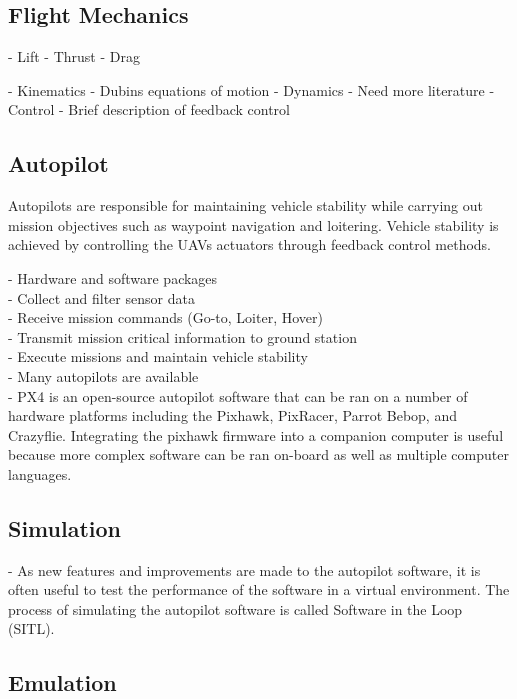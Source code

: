 \documentclass[numbered,pdftex]{ohio-etd}
\begin{document}
\subsection{Flight Mechanics}

- Lift
- Thrust
- Drag

- Kinematics
	- Dubins equations of motion
- Dynamics
	- Need more literature
- Control
	- Brief description of feedback control 
\subsection{Autopilot}

Autopilots are responsible for maintaining vehicle stability while carrying out mission objectives such as waypoint navigation and loitering. Vehicle stability is achieved by controlling the UAVs actuators through feedback control methods. 



- Hardware and software packages \\
- Collect and filter sensor data \\
- Receive mission commands (Go-to, Loiter, Hover) \\
- Transmit mission critical information to ground station \\
- Execute missions and maintain vehicle stability \\

- Many autopilots are available \\
- PX4 is an open-source autopilot software that can be ran on a number of hardware platforms including the Pixhawk, PixRacer, Parrot Bebop, and Crazyflie. Integrating the pixhawk firmware into a companion computer is useful because more complex software can be ran on-board as well as multiple computer languages. \\



\subsection{Simulation}
- As new features and improvements are made to the autopilot software, it is often useful to test the performance of the software in a virtual environment. The process of simulating the autopilot software is called Software in the Loop (SITL).

\subsection{Emulation}
\end{document}
